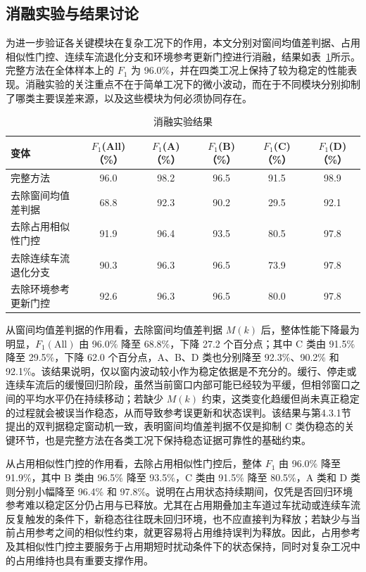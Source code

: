 \documentclass{xdupgthesis}
\begin{document}
\subsection{消融实验与结果讨论}
\label{subsec:ch4_ablation}

为进一步验证各关键模块在复杂工况下的作用，本文分别对窗间均值差判据、占用相似性门控、连续车流退化分支和环境参考更新门控进行消融，结果如表~\ref{tab:ch4_ablation}所示。完整方法在全体样本上的 $F_1$ 为 96.0\%，并在四类工况上保持了较为稳定的性能表现。消融实验的关注重点不在于简单工况下的微小波动，而在于不同模块分别抑制了哪类主要误差来源，以及这些模块为何必须协同存在。

\begin{table}[!htbp]
    \centering
    \caption{消融实验结果}
    \label{tab:ch4_ablation}
    \small
    \setlength{\tabcolsep}{6pt}
    \begin{tabular}{lccccc}
        \hline
        变体 & $F_1$(All)（\%） & $F_1$(A)（\%） & $F_1$(B)（\%） & $F_1$(C)（\%） & $F_1$(D)（\%） \\
        \hline
        完整方法 & 96.0 & 98.2 & 96.5 & 91.5 & 98.9 \\
        去除窗间均值差判据 & 68.8 & 92.3 & 90.2 & 29.5 & 92.1 \\
        去除占用相似性门控 & 91.9 & 96.4 & 93.5 & 80.5 & 97.8 \\
        去除连续车流退化分支 & 90.3 & 96.3 & 96.5 & 73.9 & 97.8 \\
        去除环境参考更新门控 & 92.6 & 96.3 & 96.5 & 80.0 & 97.8 \\
        \hline
    \end{tabular}
\end{table}

从窗间均值差判据的作用看，去除窗间均值差判据 $M(k)$ 后，整体性能下降最为明显，$F_1(\mathrm{All})$ 由 96.0\% 降至 68.8\%，下降 27.2 个百分点；其中 C 类由 91.5\% 降至 29.5\%，下降 62.0 个百分点，A、B、D 类也分别降至 92.3\%、90.2\% 和 92.1\%。该结果说明，仅以窗内波动较小作为稳定依据是不充分的。缓行、停走或连续车流后的缓慢回归阶段，虽然当前窗口内部可能已经较为平缓，但相邻窗口之间的平均水平仍在持续移动；若缺少 $M(k)$ 约束，这类变化趋缓但尚未真正稳定的过程就会被误当作稳态，从而导致参考误更新和状态误判。该结果与第4.3.1节提出的双判据稳定窗动机一致，表明窗间均值差判据不仅是抑制 C 类伪稳态的关键环节，也是完整方法在各类工况下保持稳态证据可靠性的基础约束。

从占用相似性门控的作用看，去除占用相似性门控后，整体 $F_1$ 由 96.0\% 降至 91.9\%，其中 B 类由 96.5\% 降至 93.5\%，C 类由 91.5\% 降至 80.5\%，A 类和 D 类则分别小幅降至 96.4\% 和 97.8\%。说明在占用状态持续期间，仅凭是否回归环境参考难以稳定区分仍占用与已释放。尤其在占用期叠加主车道过车扰动或连续车流反复触发的条件下，新稳态往往既未回归环境，也不应直接判为释放；若缺少与当前占用参考之间的相似性约束，就更容易将占用维持误判为释放。因此，占用参考及其相似性门控主要服务于占用期短时扰动条件下的状态保持，同时对复杂工况中的占用维持也具有重要支撑作用。
\end{document}
